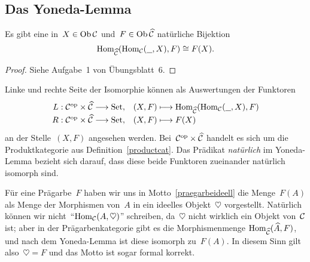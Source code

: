 \subsection{Das Yoneda-Lemma}

\begin{lemma}Es gibt eine in~$X \in \operatorname{Ob} \mathcal{C}$ und~$F \in \operatorname{Ob} \widehat {\mathcal{C}}$
natürliche Bijektion
\[ \mathrm{Hom}_{\widehat{\mathcal{C}}}(\mathrm{Hom}_{\mathcal{C}}(\underline{\ \ }, X), F) \cong F(X). \]
\end{lemma}
\begin{proof}Siehe Aufgabe~1 von Übungsblatt~6.\end{proof}
Linke und rechte Seite der Isomorphie können als Auswertungen der Funktoren
\[ \renewcommand{\arraystretch}{1.3}\begin{array}{@{}rl@{}}
  L : \C^\op \times \widehat\C \longrightarrow \Set, &
  (X,F) \longmapsto \Hom_{\widehat\C}(\Hom_\C(\freist,X), F)
  \\
  R : \C^\op \times \widehat\C \longrightarrow \Set, &
  (X,F) \longmapsto F(X)
\end{array} \]
an der Stelle~$(X,F)$ angesehen werden. Bei~$\mathcal{C}^{\mathrm{op}} \times \widehat{\mathcal{C}}$ handelt
es sich um die Produktkategorie aus Definition~\ref{productcat}.
Das Prädikat \emph{natürlich} im Yoneda-Lemma bezieht
sich darauf, dass diese beide Funktoren zueinander natürlich isomorph sind.

\begin{bsp}Für eine Prägarbe~$F$ haben wir uns in
Motto~\ref{praegarbeideell} die Menge~$F(A)$ als Menge der Morphismen von~$A$
in ein ideelles Objekt~$\heartsuit$ vorgestellt. Natürlich können wir
nicht~"`$\mathrm{Hom}_{\mathcal{C}}(A,\heartsuit)$"' schreiben, da~$\heartsuit$ nicht wirklich ein
Objekt von~$\mathcal{C}$ ist; aber in der Prägarbenkategorie gibt es die Morphismenmenge
$\mathrm{Hom}_{\widehat{\mathcal{C}}}(\widehat A,F)$, und nach dem Yoneda-Lemma ist diese isomorph
zu~$F(A)$. In diesem Sinn gilt also~$\heartsuit = F$ und das Motto ist sogar formal
korrekt.\end{bsp}


